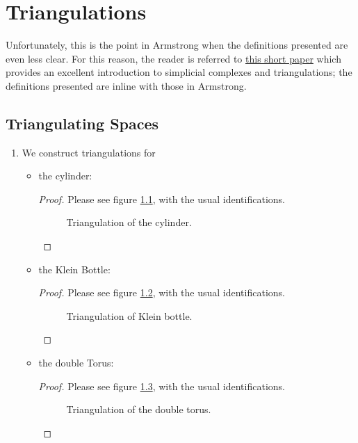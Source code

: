\documentclass{book}
\begin{document}
\chapter{Triangulations}
Unfortunately, this is the point in Armstrong when the definitions presented are even less clear. For this reason, the reader is referred to \href{https://www.cs.duke.edu/courses/fall06/cps296.1/Lectures/sec-III-1.pdf}{this short paper} which provides an excellent introduction to simplicial complexes and triangulations; the definitions presented are inline with those in Armstrong.  
\section{Triangulating Spaces}
\begin{enumerate}[(1)]
    \item We construct triangulations for
        \begin{itemize}
            \item the cylinder:
                \begin{proof} Please see figure \hyperref[fig:tikz:triCyl]{\ref{fig:tikz:triCyl}}, with the usual identifications. 
                    \begin{figure}[p]
                        \centering
                        
                        \caption{Triangulation of the cylinder.}
                        \label{fig:tikz:triCyl}
                    \end{figure}
                \end{proof}

            \item the Klein Bottle: 
                \begin{proof} Please see figure \hyperref[fig:tikz:triKlein]{\ref{fig:tikz:triKlein}}, with the usual identifications.
                    \begin{figure}[p]
                        \centering
                        
                        \caption{Triangulation of Klein bottle.}
                        \label{fig:tikz:triKlein}
                    \end{figure}
                \end{proof}

            \item the double Torus: 
                \begin{proof} Please see figure \hyperref[fig:tikz:triDoubleTorus]{\ref{fig:tikz:triDoubleTorus}}, with the usual identifications. 
                    \begin{figure}[p]
                        \centering
                        
                        \caption{Triangulation of the double torus.}
                        \label{fig:tikz:triDoubleTorus}
                    \end{figure}
                \end{proof}
        \end{itemize}


\end{enumerate}
\end{document}
